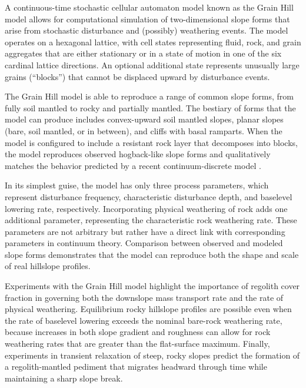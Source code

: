 \documentclass[esurf, manuscript]{copernicus}
\begin{document}
\conclusions  %

A continuous-time stochastic cellular automaton model known as the Grain Hill model allows for computational simulation of two-dimensional slope forms that arise from stochastic disturbance and (possibly) weathering events. The model operates on a hexagonal lattice, with cell states representing fluid, rock, and grain aggregates that are either stationary or in a state of motion in one of the six cardinal lattice directions. An optional additional state represents unusually large grains (``blocks'') that cannot be displaced upward by disturbance events. 

The Grain Hill model is able to reproduce a range of common slope forms, from fully soil mantled to rocky and partially mantled. The bestiary of forms that the model can produce includes convex-upward soil mantled slopes, planar slopes (bare, soil mantled, or in between), and cliffs with basal ramparts. When the model is configured to include a resistant rock layer that decomposes into blocks, the model reproduces observed hogback-like slope forms and qualitatively matches the behavior predicted by a recent continuum-discrete model \citep{glade2017block,glade2017quasi}.

In its simplest guise, the model has only three process parameters, which represent disturbance frequency, characteristic disturbance depth, and baselevel lowering rate, respectively. Incorporating physical weathering of rock adds one additional parameter, representing the characteristic rock weathering rate. These parameters are not arbitrary but rather have a direct link with corresponding parameters in continuum theory. Comparison between observed and modeled slope forms demonstrates that the model can reproduce both the shape and scale of real hillslope profiles.

Experiments with the Grain Hill model highlight the importance of regolith cover fraction in governing both the downslope mass transport rate and the rate of physical weathering. Equilibrium rocky hillslope profiles are possible even when the rate of baselevel lowering exceeds the nominal bare-rock weathering rate, because increases in both slope gradient and roughness can allow for rock weathering rates that are greater than the flat-surface maximum. Finally, experiments in transient relaxation of steep, rocky slopes predict the formation of a regolith-mantled pediment that migrates headward through time while maintaining a sharp slope break.
\end{document}
